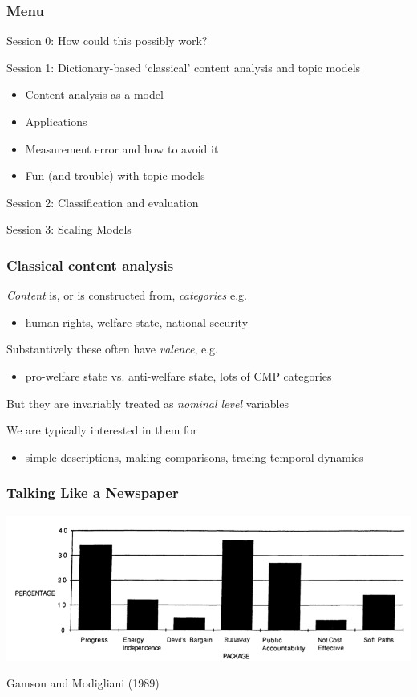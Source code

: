 \documentclass[11pt,compress,professionalfonts]{beamer}
\newcommand{\ita}{\begin{itemize}}
\newcommand{\itm}{\item[]}
\newcommand{\itz}{\end{itemize}}
\begin{document}
\begin{frame}[t]\frametitle{Menu}

Session 0: How could this possibly work?

Session 1: Dictionary-based `classical' content analysis and topic models
\ita
\itm Content analysis as a model
\itm Applications
\itm Measurement error and how to avoid it
\itm Fun (and trouble) with topic models
\itz

Session 2: Classification and evaluation

Session 3: Scaling Models

\slide{}


\end{frame}
\begin{frame}[t]\frametitle{Classical content analysis}

\textsl{Content} is, or is constructed from, \textsl{categories} e.g.
\ita
\itm human rights, welfare state, national security
\itz
Substantively these often have \textsl{valence}, e.g.
\ita
\itm pro-welfare state vs. anti-welfare state, lots of CMP categories
\itz
But they are invariably treated as \textsl{nominal level} variables

We are typically interested in them for
\ita
\itm simple descriptions, making comparisons, tracing temporal dynamics
\itz

\end{frame}
\begin{frame}[t]\frametitle{Talking Like a Newspaper}

\centerline{\includegraphics[scale=.8]{pictures/gamson-modigliani-frames-opinion}}
Gamson and Modigliani (1989)


\end{frame}
\end{document}

